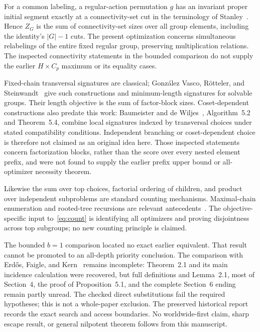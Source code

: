 \documentclass[11pt,letterpaper]{article}
\theoremstyle{definition}\newtheorem{definition}{Definition}
\begin{document}
For a common labeling, a regular-action permutation $g$ has an invariant proper initial segment exactly at a connectivity-set cut in the terminology of Stanley~\cite{stanley}. Hence $Z_G$ is the sum of connectivity-set sizes over all group elements, including the identity's $|G|-1$ cuts. The present optimization concerns simultaneous relabelings of the entire fixed regular group, preserving multiplication relations. The inspected connectivity statements in the bounded comparison do not supply the earlier $H\times C_p$ maximum or its equality cases.

Fixed-chain transversal signatures are classical; Gonz\'alez Vasco, R\"otteler, and Steinwandt~\cite{gvs} give such constructions and minimum-length signatures for solvable groups. Their length objective is the sum of factor-block sizes. Coset-dependent constructions also predate this work: Baumeister and de Wiljes~\cite{bdw}, Algorithm~5.2 and Theorem~5.4, combine local signatures indexed by transversal choices under stated compatibility conditions. Independent branching or coset-dependent choice is therefore not claimed as an original idea here. Those inspected statements concern factorization blocks, rather than the score over every nested element prefix, and were not found to supply the earlier prefix upper bound or all-optimizer necessity theorem.

Likewise the sum over top choices, factorial ordering of children, and product over independent subproblems are standard counting mechanisms. Maximal-chain enumeration and rooted-tree recursions are relevant antecedents~\cite{st,mbkk}. The objective-specific input to~\eqref{eq:count} is identifying all optimizers and proving disjointness across top subgroups; no new counting principle is claimed.

The bounded $b=1$ comparison located no exact earlier equivalent. That result cannot be promoted to an all-depth priority conclusion. The comparison with Erd\H{o}s, Faigle, and Kern~\cite{efk} remains incomplete: Theorem~2.1 and its main incidence calculation were recovered, but full definitions and Lemma~2.1, most of Section~4, the proof of Proposition~5.1, and the complete Section~6 ending remain partly unread. The checked direct substitutions fail the required hypotheses; this is not a whole-paper exclusion. The preserved historical report records the exact search and access boundaries. No worldwide-first claim, sharp escape result, or general nilpotent theorem follows from this manuscript.

\appendix
\end{document}
